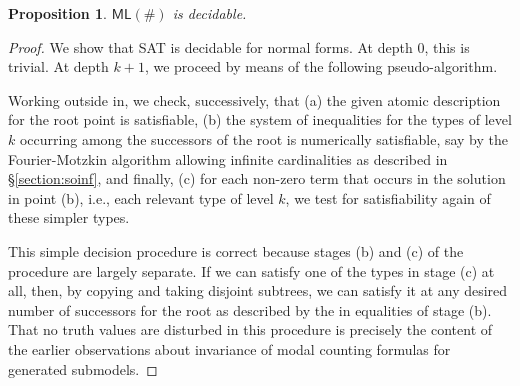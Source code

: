 \documentclass[12pt,oneside,reqno]{amsart}
\newtheorem{proposition}{Proposition}
\theoremstyle{definition}
\begin{document}





\begin{proposition} $\mathsf{ML(\#)}$ is decidable.  \label{prop:mldec}  \end{proposition}

\begin{proof} We show that SAT is decidable for normal forms. At depth 0, this is trivial. At depth $k + 1$, we proceed by means of the following pseudo-algorithm. 

Working outside in, we check, successively, that (a) the given atomic description for the root point is satisfiable, (b) the system of inequalities for the types of level $k$ occurring among the successors of the root is numerically satisfiable, say by the Fourier-Motzkin algorithm allowing infinite cardinalities as described in \S\ref{section:soinf}, and finally, (c) for each non-zero term that occurs in the solution in point (b), i.e., each relevant type of level $k$, we test for satisfiability again of these simpler types. 

This simple decision procedure is correct because stages (b) and (c) of the procedure are largely separate. If we can satisfy one of the types in stage (c) at all, then, by copying and taking disjoint subtrees, we can satisfy it at any desired number of successors for the root as described by the in equalities of stage (b). That no truth values are disturbed in this procedure is precisely the content of the earlier observations about invariance of modal counting formulas for generated submodels.
\end{proof}
\end{document}
